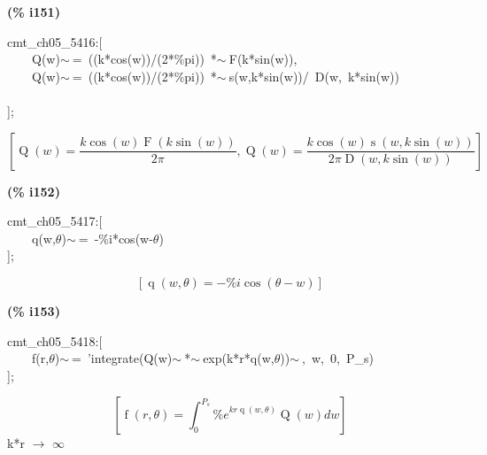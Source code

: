 \documentclass[fleqn]{article}
\begin{document}
\noindent
\begin{minipage}[t]{4.000000em}\color{red}\bfseries
(\% i151)	
\end{minipage}
\begin{minipage}[t]{\textwidth}\color{blue}
cmt\_ch05\_5416:[\\
\ \ \ \ Q(w)\ensuremath{\sim\ }=\ ((k*cos(w))/(2*\%pi))\ *\ensuremath{\sim\ }F(k*sin(w)),\\
\ \ \ \ Q(w)\ensuremath{\sim\ }=\ ((k*cos(w))/(2*\%pi))\ *\ensuremath{\sim\ }s(w,k*sin(w))/\ D(w,\ k*sin(w))\\
\\
];
\end{minipage}
\[\displaystyle \tag{\% o151} 
\left[ \operatorname{Q}(w)=\frac{k \cos{(w)} \operatorname{F}\left( k \sin{(w)}\right) }{2 \ensuremath{\pi} }\operatorname{,}\operatorname{Q}(w)=\frac{k \cos{(w)} \operatorname{s}\left( w\operatorname{,}k \sin{(w)}\right) }{2 \ensuremath{\pi}  \operatorname{D}\left( w\operatorname{,}k \sin{(w)}\right) }\right] \mbox{}
\]


\noindent
\begin{minipage}[t]{4.000000em}\color{red}\bfseries
(\% i152)	
\end{minipage}
\begin{minipage}[t]{\textwidth}\color{blue}
cmt\_ch05\_5417:[\\
\ \ \ \ q(w,\ensuremath{\theta})\ensuremath{\sim\ }=\ -\%i*cos(w-\ensuremath{\theta})\\
];
\end{minipage}
\[\displaystyle \tag{\% o152} 
\left[ \operatorname{q}\left( w\operatorname{,}\theta \right) =-\% i \cos{\left( \theta -w\right) }\right] \mbox{}
\]


\noindent
\begin{minipage}[t]{4.000000em}\color{red}\bfseries
(\% i153)	
\end{minipage}
\begin{minipage}[t]{\textwidth}\color{blue}
cmt\_ch05\_5418:[\\
\ \ \ \ f(r,\ensuremath{\theta})\ensuremath{\sim\ }=\ 'integrate(Q(w)\ensuremath{\sim\ }*\ensuremath{\sim\ }exp(k*r*q(w,\ensuremath{\theta}))\ensuremath{\sim\ },\ w,\ 0,\ P\_s)\\
];
\end{minipage}
\[\displaystyle \tag{\% o153} 
\left[ \operatorname{f}\left( r\operatorname{,}\theta \right) =\int_{0}^{{P_s}}{\left. {{\% e}^{k r \operatorname{q}\left( w\operatorname{,}\theta \right) }} \operatorname{Q}(w)dw\right.}\right] \mbox{}
\]
k*r \ensuremath{\longrightarrow} \ensuremath{\infty}
\end{document}
